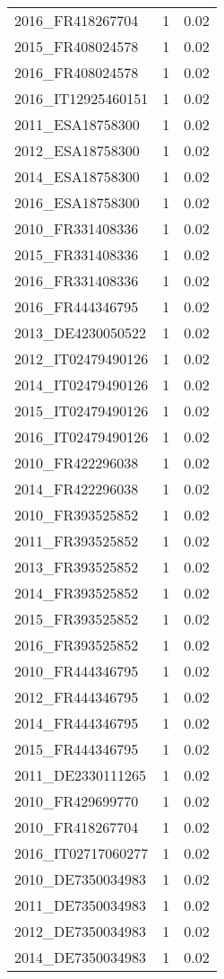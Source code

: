 \begin{table*}[htbp]
\begin{tabular}{lrr}
2016_FR418267704 & 1 & 0.02 \\
2015_FR408024578 & 1 & 0.02 \\
2016_FR408024578 & 1 & 0.02 \\
2016_IT12925460151 & 1 & 0.02 \\
2011_ESA18758300 & 1 & 0.02 \\
2012_ESA18758300 & 1 & 0.02 \\
2014_ESA18758300 & 1 & 0.02 \\
2016_ESA18758300 & 1 & 0.02 \\
2010_FR331408336 & 1 & 0.02 \\
2015_FR331408336 & 1 & 0.02 \\
2016_FR331408336 & 1 & 0.02 \\
2016_FR444346795 & 1 & 0.02 \\
2013_DE4230050522 & 1 & 0.02 \\
2012_IT02479490126 & 1 & 0.02 \\
2014_IT02479490126 & 1 & 0.02 \\
2015_IT02479490126 & 1 & 0.02 \\
2016_IT02479490126 & 1 & 0.02 \\
2010_FR422296038 & 1 & 0.02 \\
2014_FR422296038 & 1 & 0.02 \\
2010_FR393525852 & 1 & 0.02 \\
2011_FR393525852 & 1 & 0.02 \\
2013_FR393525852 & 1 & 0.02 \\
2014_FR393525852 & 1 & 0.02 \\
2015_FR393525852 & 1 & 0.02 \\
2016_FR393525852 & 1 & 0.02 \\
2010_FR444346795 & 1 & 0.02 \\
2012_FR444346795 & 1 & 0.02 \\
2014_FR444346795 & 1 & 0.02 \\
2015_FR444346795 & 1 & 0.02 \\
2011_DE2330111265 & 1 & 0.02 \\
2010_FR429699770 & 1 & 0.02 \\
2010_FR418267704 & 1 & 0.02 \\
2016_IT02717060277 & 1 & 0.02 \\
2010_DE7350034983 & 1 & 0.02 \\
2011_DE7350034983 & 1 & 0.02 \\
2012_DE7350034983 & 1 & 0.02 \\
2014_DE7350034983 & 1 & 0.02 \\

\end{tabular}
\end{table*}
